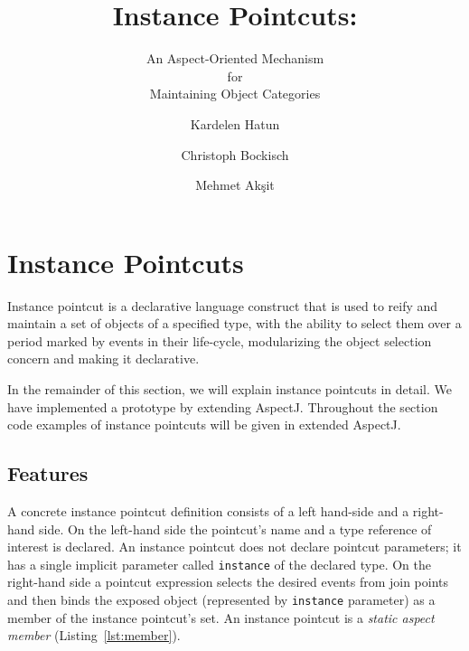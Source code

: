 \documentclass{llncs}
\begin{document}
\title{Instance Pointcuts:}
\subtitle{An Aspect-Oriented Mechanism \\for \\Maintaining Object Categories}

\author{Kardelen Hatun \and Christoph Bockisch \and Mehmet Ak\c{s}it}




\section{Instance Pointcuts}
Instance pointcut is a declarative language construct that is used to reify and maintain a set of objects of a specified type, with the ability to select them over a period marked by events in their life-cycle, modularizing the object selection concern and making it declarative. 
 
In the remainder of this section, we will explain instance pointcuts in detail. We have implemented a prototype by extending AspectJ. Throughout the section code examples of instance pointcuts will be given in extended AspectJ.


\subsection{Features}

A concrete instance pointcut definition consists of a left hand-side and a right-hand side. 
On the left-hand side the pointcut's name and a type reference of interest is declared. 
An instance pointcut does not declare pointcut parameters; it has a single implicit parameter called \texttt{instance} of the declared type. 
On the right-hand side a pointcut expression selects the desired events from join points and then binds the exposed object (represented by \texttt{instance} parameter) as a member of the instance pointcut's set. 
An instance pointcut is a \emph{static aspect member} (Listing~\ref{lst:member}).%
\end{document}
